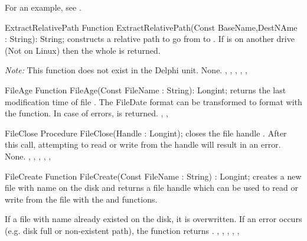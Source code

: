 For an example, see .
 
\begin{function}{ExtractRelativePath}
\Declaration
Function ExtractRelativePath(Const BaseName,DestNAme : String): String;
\Description
{} constructs a relative path to go from
 to . If  is on another drive
(Not on Linux) then the whole  is returned.

{\em Note:} This function does not exist in the Delphi unit.
\Errors
None.
\SeeAlso
{}, , ,
, ,
\end{function}

\html{}

\begin{function}{FileAge}
\Declaration
Function FileAge(Const FileName : String): Longint;
\Description
{} returns the last modification time of file .
The FileDate format can be transformed to  format with the
 function.
\Errors
In case of errors,  is returned.
\SeeAlso
{}, , 
\end{function}

\html{}

 
\begin{procedure}{FileClose}
\Declaration
Procedure FileClose(Handle : Longint);
\Description
{} closes the file handle . After this call,
attempting to read or write from the handle will result in an error.
\Errors
None.
\SeeAlso
{}, , , ,
, 
\end{procedure}

 
\begin{function}{FileCreate}
\Declaration
Function FileCreate(Const FileName : String) : Longint;
\Description
{} creates a new file with name  on the disk and
returns a file handle which can be used to read or write from the file with
the  and  functions.

If a file with name  already existed on the disk, it is
overwritten.
\Errors
If an error occurs (e.g. disk full or non-existent path), the function
returns .
\SeeAlso
{}, , , ,
, 
\end{function}

